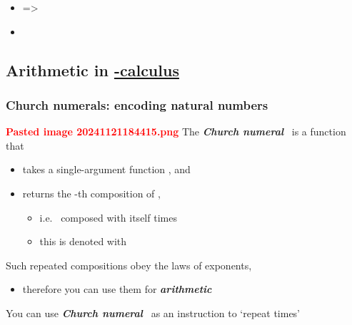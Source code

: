 \begin{itemize}
\tightlist
\item
  =\textgreater{}
\item
\end{itemize}

\subsection*{\texorpdfstring{Arithmetic in
\ul{\iMbox{\lambda}-calculus}}{Arithmetic in -calculus}}

\subsubsection*{\texorpdfstring{Church numerals: encoding natural
numbers }{Church numerals: encoding natural numbers }}

\textcolor{red}{\textbf{Pasted image 20241121184415.png}} The
\textbf{\textit{Church
numeral}}~ is
a function that

\begin{itemize}
\tightlist
\item
  takes a single-argument function , and
\item
  returns the -th composition of ,

  \begin{itemize}
  \tightlist
  \item
    i.e.~ composed with itself  times
  \item
    this is denoted with 
  \end{itemize}
\end{itemize}

Such repeated compositions  obey the laws
of exponents,

\begin{itemize}
\tightlist
\item
  therefore you can use them for \textbf{\textit{arithmetic}}
\end{itemize}

You can use \textbf{\textit{Church numeral}}~ as an instruction
to `repeat  times'

